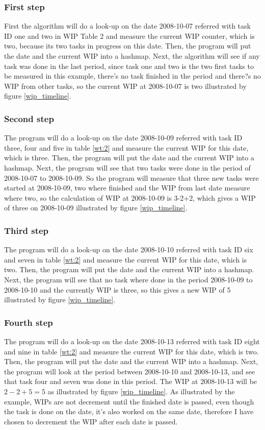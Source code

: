 \documentclass[UKenglish]{ifimaster}  %
\begin{document}
\subsubsection{First step}
\label{subsubsec:ft}
First the algorithm will do a look-up on the date 2008-10-07 referred with task ID one and two in WIP Table 2 and measure the current WIP counter, which is two, because its two tasks in progress on this date. Then, the program will put the date and the current WIP into a hashmap. 
Next, the algorithm will see if any task was done in the last period, since task one and two is the two first tasks to be measured in this example, there's no task finished in the period and there?s no WIP from other tasks, so the current WIP at 2008-10-07 is two illustrated by figure \ref{wip_timeline}. 
\subsubsection{Second step}
The program will do a look-up on the date 2008-10-09 referred with task ID three, four and five in table \ref{wt:2}  and measure the current WIP for this date, which is three. Then, the program will put the date and the current WIP into a hashmap.
Next, the program will see that two tasks were done in the period of 2008-10-07 to 2008-10-09. So the program will measure that three new tasks were started at 2008-10-09, two where finished and the WIP from last date measure where two, so the calculation of WIP at 2008-10-09 is 3-2+2, which gives a WIP of three on 2008-10-09 illustrated by figure \ref{wip_timeline}. 

\subsubsection{Third step}
The program will do a look-up on the date 2008-10-10 referred with task ID six and seven in table \ref{wt:2}  and measure the current WIP for this date, which is two. Then, the program will put the date and the current WIP into a hashmap.
Next, the program will see that no task where done in the period 2008-10-09 to 2008-10-10 and the currently WIP is three, so this gives a new WIP of 5 illustrated by figure \ref{wip_timeline}. 

\subsubsection{Fourth step}
The program will do a look-up on the date 2008-10-13 referred with task ID eight and nine in table \ref{wt:2}  and measure the current WIP for this date, which is two. Then, the program will put the date and the current WIP into a hashmap. 
Next, the program will look at the period between 2008-10-10 and 2008-10-13, and see that task four and seven was done in this period. The WIP at 2008-10-13 will be $2-2+5 = 5$ as illustrated by figure \ref{wip_timeline}. 
As illustrated by the example, WIPs are not decrement until the finished date is passed, even though the task is done on the date, it's also worked on the same date, therefore I have chosen to decrement the WIP after each date is passed.
\end{document}
